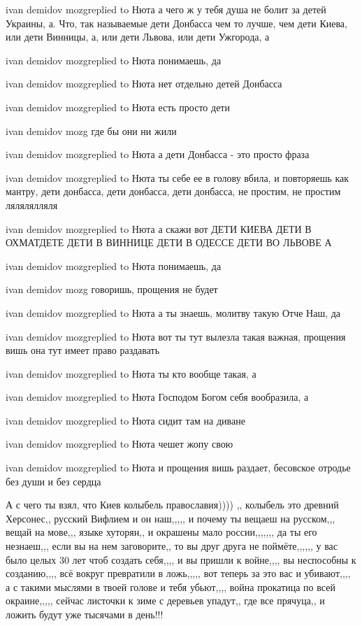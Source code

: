 ivan demidov mozgreplied to Нюта
а чего ж у тебя душа не болит за детей Украины, а. Что, так называемые дети Донбасса чем то лучше, чем дети Киева, или дети Винницы, а, или дети Львова, или дети Ужгорода, а

ivan demidov mozgreplied to Нюта
понимаешь, да

ivan demidov mozgreplied to Нюта
нет отдельно детей Донбасса

ivan demidov mozgreplied to Нюта
есть просто дети

ivan demidov mozg
где бы они ни жили

ivan demidov mozgreplied to Нюта
а дети Донбасса - это просто фраза

ivan demidov mozgreplied to Нюта
ты себе ее в голову вбила, и повторяешь как мантру, дети донбасса, дети донбасса, дети донбасса, не простим, не простим лялялялляля

ivan demidov mozgreplied to Нюта
а скажи вот ДЕТИ КИЕВА ДЕТИ В ОХМАТДЕТЕ ДЕТИ В ВИННИЦЕ ДЕТИ В ОДЕССЕ ДЕТИ ВО ЛЬВОВЕ А

ivan demidov mozgreplied to Нюта
понимаешь, да

ivan demidov mozg
говоришь, прощения не будет

ivan demidov mozgreplied to Нюта
а ты знаешь, молитву такую Отче Наш, да

ivan demidov mozgreplied to Нюта
вот ты тут вылезла такая важная, прощения вишь она тут имеет право раздавать

ivan demidov mozgreplied to Нюта
ты кто вообще такая, а

ivan demidov mozgreplied to Нюта
Господом Богом себя вообразила, а

ivan demidov mozgreplied to Нюта
сидит там на диване

ivan demidov mozgreplied to Нюта
чешет жопу свою

ivan demidov mozgreplied to Нюта
и прощения вишь раздает, бесовское отродье без души и без сердца


А с чего ты взял, что Киев колыбель православия)))) ,, колыбель это древний
Херсонес,, русский Вифлием и он наш,,,,, и почему ты вещаеш на русском,,, вещай
на мове,,, языке хуторян,, и окрашены мало россии,,,,,,, да ты его незнаеш,,,
если вы на нем заговорите,, то вы друг друга не поймёте,,,,,, у вас было целых
30 лет чтоб создать себя,,,, и вы пришли к войне,,,, вы неспособны к
созданию,,,, всё вокруг превратили в ложь,,,,, вот теперь за это вас и
убивают,,,, а с такими мыслями в твоей голове и тебя убьют,,,, война прокатица
по всей окраине,,,,, сейчас листочки к зиме с деревьев упадут,, где все
прячуца,, и ложить будут уже тысячами в день!!!

